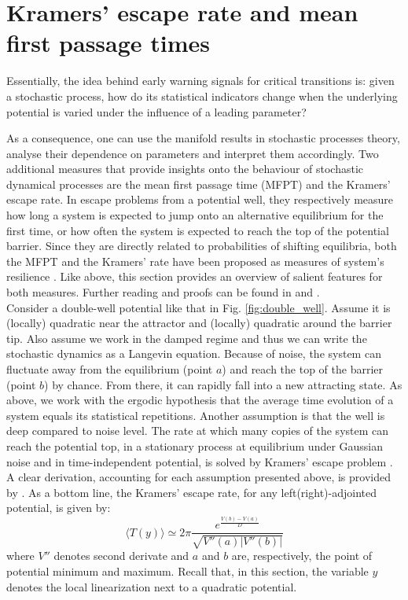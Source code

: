 \tocless\section{Kramers' escape rate and mean first passage times}
\label{subsec:kramer}
Essentially, the idea behind early warning signals for critical transitions is: given a stochastic process, how do its statistical indicators change when the underlying potential is varied under the influence of a leading parameter? 

As a consequence, one can use the manifold results in stochastic processes theory, analyse their dependence on parameters and interpret them accordingly. Two additional measures that provide insights onto the behaviour of stochastic dynamical processes are the mean first passage time (\gls{MFPT}) and the Kramers' escape rate. In escape problems from a potential well, they respectively measure how long a system is expected to jump onto an alternative equilibrium for the first time, or how often the system is expected to reach the top of the potential barrier. Since they are directly related to probabilities of shifting equilibria, both the \gls{MFPT} and the Kramers' rate have been proposed as measures of system's resilience \citep{Sharma2016,Arani2021}.  Like above, this section provides an overview of salient features for both measures. Further reading and proofs can be found in \textcite{van1992stochastic} and \textcite{Gardiner1985}. \\

Consider a double-well potential like that in Fig. \ref{fig:double_well}. Assume it is (locally) quadratic near the attractor and (locally) quadratic around the barrier tip. Also assume we work in the damped regime and thus we can write the stochastic dynamics as a Langevin equation. Because of noise, the system can fluctuate away from the equilibrium (point $a$) and reach the top of the barrier (point $b$) by chance. From there, it can rapidly fall into a new attracting state. As above, we work with the ergodic hypothesis that the average time evolution of a system equals its statistical repetitions. Another assumption is that the well is deep compared to noise level. The rate at which many copies of the system can reach the potential top, in a stationary process at equilibrium under Gaussian noise and in time-independent potential, is solved by Kramers' escape problem \citep{van1992stochastic}. A clear derivation, accounting for each assumption presented above, is provided by \textcite{ritchie2016early}. As a bottom line, the Kramers' escape rate, for any left(right)-adjointed potential, is given by:
\begin{equation} \label{eq:kramers}
	\langle T(y) \rangle \simeq 2 \pi \frac{e^{\frac{V(b) - V(a)}{D}}}{\sqrt{V''(a) |V''(b)|}}
\end{equation}
where $V''$ denotes second derivate and $a$ and $b$ are, respectively, the point of potential minimum and maximum. Recall that, in this section, the variable $y$ denotes the local linearization next to a quadratic potential.


